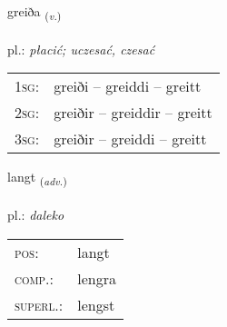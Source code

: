 \documentclass[frontgrid, backgrid]{flacards}\usepackage[]{graphicx}\usepackage[]{xcolor}
\begin{document}
\renewcommand{\blhead}{\vskip5pt {\small\bfseries\footnotesize Sagnorð | Verb }}
\renewcommand{\bcfoot}{\vskip5pt \hspace{2pt}{\small\bfseries\footnotesize 1K}}


{greiða \small{\textsubscript{(\textit{v.})}} \\[1ex] %
\textphonetic{[kreiːða]} \\
pl.: \emph{płacić; uczesać, czesać} \\  [2ex]
\renewcommand*{\arraystretch}{0.8}
\begin{tabular}{p{1cm}l}
\textsc{1sg}: & greiði -- greiddi -- greitt \\ 
\textsc{2sg}: & greiðir -- greiddir -- greitt \\ 
\textsc{3sg}: & greiðir -- greiddi -- greitt \\ 
\end{tabular}
}

\renewcommand{\flhead}{\vskip5pt \fboxsep=0pt {\small\bfseries\footnotesize Atviksorð | Adverb}}
\renewcommand{\fcfoot}{\vskip5pt \fboxsep=0pt \hspace{2pt}{\small\bfseries\footnotesize 1K}}

\renewcommand{\blhead}{\vskip5pt {\small\bfseries\footnotesize Atviksorð | Adverb }}
\renewcommand{\bcfoot}{\vskip5pt \hspace{2pt}{\small\bfseries\footnotesize 1K}}


{langt \small{\textsubscript{(\textit{adv.})}} \\[1ex] %
\textphonetic{[lauŋ̊t]} \\
pl.: \emph{daleko} \\  [2ex]
\renewcommand*{\arraystretch}{0.8}
\begin{tabular}{ll}
\textsc{pos}: & langt \\ 
\textsc{comp.}: & lengra \\ 
\textsc{superl.}: & lengst \\
\end{tabular}
}

\renewcommand{\flhead}{\vskip5pt \fboxsep=0pt {\small\bfseries\footnotesize Nafnorð | Noun}}
\renewcommand{\fcfoot}{\vskip5pt \fboxsep=0pt \hspace{2pt}{\small\bfseries\footnotesize 1K}}
\end{document}
